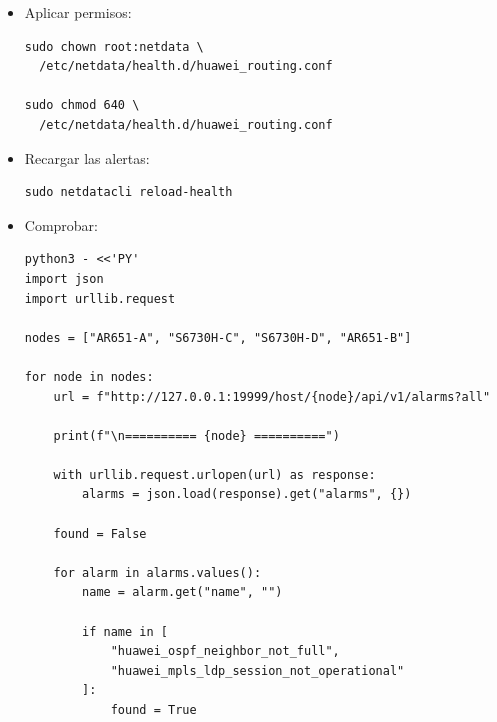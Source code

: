 \begin{itemize}
\begin{lstlisting}[style=terminal]
template: huawei_mpls_ldp_expected_link_down
      on: huawei.routing.ldp_link
   class: Availability
    type: Network
component: MPLS
    calc: $available
   units: state
   every: 30s
    crit: $this < 1
   delay: up 30s down 30s
 summary: Sesion MPLS LDP ${label:link} caida
    info: La sesion MPLS LDP ${label:link} dejo de estar en estado Operational o alguno de sus extremos no responde por SNMP.
      to: sysadmin
 \end{lstlisting}

 La ventana de un minuto tolera una muestra aislada, mientras que el retraso de 30 segundos evita alertas por una transición demasiado breve. Las variables label:neighbor, label:peer y label:sysName se sustituyen por las etiquetas de cada gráfica.

 \item Aplicar permisos:
 \begin{lstlisting}[style=terminal]
 sudo chown root:netdata \
  /etc/netdata/health.d/huawei_routing.conf

sudo chmod 640 \
  /etc/netdata/health.d/huawei_routing.conf

 \end{lstlisting}


\item Recargar las alertas:

\begin{lstlisting}[style=terminal]
sudo netdatacli reload-health
 \end{lstlisting}

\item Comprobar:
\begin{lstlisting}[style=terminal]
python3 - <<'PY'
import json
import urllib.request

nodes = ["AR651-A", "S6730H-C", "S6730H-D", "AR651-B"]

for node in nodes:
    url = f"http://127.0.0.1:19999/host/{node}/api/v1/alarms?all"

    print(f"\n========== {node} ==========")

    with urllib.request.urlopen(url) as response:
        alarms = json.load(response).get("alarms", {})

    found = False

    for alarm in alarms.values():
        name = alarm.get("name", "")

        if name in [
            "huawei_ospf_neighbor_not_full",
            "huawei_mpls_ldp_session_not_operational"
        ]:
            found = True


\end{lstlisting}
\end{itemize}
